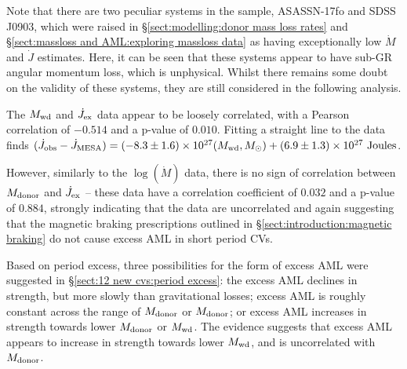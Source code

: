 Note that there are two peculiar systems in the sample, ASASSN-17fo and SDSS J0903, which were raised in \S\ref{sect:modelling:donor mass loss rates} and \S\ref{sect:massloss and AML:exploring massloss data} as having exceptionally low $\dot M$ and $\dot J$ estimates. Here, it can be seen that these systems appear to have sub-GR angular momentum loss, which is unphysical. Whilst there remains some doubt on the validity of these systems, they are still considered in the following analysis.

The $M_{\rm wd}$ and $\dot J_{\rm ex}$ data appear to be loosely correlated, with a Pearson correlation of $-0.514$ and a p-value of $0.010$. Fitting a straight line to the data finds $(\dot J_{\rm obs} - \dot J_{\rm MESA}) = (-8.3\pm1.6) \times 10^{27}(M_{\rm wd}, M_\odot) + (6.9\pm1.3)\times10^{27}~{\rm Joules}$.

However, similarly to the $\log (\dot M)$ data, there is no sign of correlation between $M_{\rm donor}$ and $\dot J_{\rm ex}$ -- these data have a correlation coefficient of $0.032$ and a p-value of $0.884$, strongly indicating that the data are uncorrelated and again suggesting that the magnetic braking prescriptions outlined in \S\ref{sect:introduction:magnetic braking} do not cause excess AML in short period CVs.

Based on period excess, three possibilities for the form of excess AML were suggested in \S\ref{sect:12 new cvs:period excess}: the excess AML declines in strength, but more slowly than gravitational losses; excess AML is roughly constant across the range of $M_{\rm donor}$ or $M_{\rm donor}$; or excess AML increases in strength towards lower $M_{\rm donor}$ or $M_{\rm wd}$.
The evidence suggests that excess AML appears to increase in strength towards lower $M_{\rm wd}$, and is uncorrelated with $M_{\rm donor}$.


